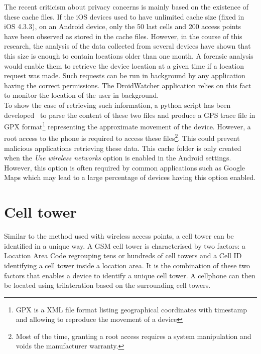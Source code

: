 The recent criticism about privacy concerns is mainly based on the existence of these cache files.
If the iOS devices used to have unlimited cache size (fixed in iOS 4.3.3), on an Android device, only the 50 last cells and 200 access points have been observed as stored in the cache files.
However, in the course of this research, the analysis of the data collected from several devices have shown that this size is enough to contain locations older than one month.
A forensic analysis would enable them to retrieve the device location at a given time if a location request was made.
Such requests can be run in background by any application having the correct permissions.
The DroidWatcher application relies on this fact to monitor the location of the user in background.\\

To show the ease of retrieving such information, a python script has been developed~\cite{soft-locdump} to parse the content of these two files and produce a GPS trace file in GPX format\footnote{GPX is a XML file format listing geographical coordinates with timestamp and allowing to reproduce the movement of a device} representing the approximate movement of the device.
However, a root access to the phone is required to access these files\footnote{Most of the time, granting a root access requires a system manipulation and voids the manufacturer warranty.}.
This could prevent malicious applications retrieving these data.
This cache folder is only created when the \emph{Use wireless networks} option is enabled in the Android settings.
However, this option is often required by common applications such as Google Maps which may lead to a large percentage of devices having this option enabled.\\

\section{Cell tower}
\label{sec:loc-cell-tower}
Similar to the method used with wireless access points, a cell tower can be identified in a unique way.
A GSM cell tower is characterised by two factors: a Location Area Code regrouping tens or hundreds of cell towers and a Cell ID identifying a cell tower inside a location area.
It is the combination of these two factors that enables a device to identify a unique cell tower.
A cellphone can then be located using trilateration based on the surrounding cell towers.\\

